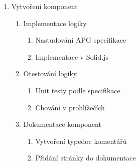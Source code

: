 \begin{enumerate}[label=\arabic*.]
\begin{enumerate}[label*=\arabic*.]
\begin{enumerate}[label*=\arabic*.]
\begin{enumerate}[label*=\arabic*.]
                                  \item Vytvoření typedoc\footnote{\url{https://typedoc.org}} dokumentace
                                  \item Nasazení aplikací
                              \end{enumerate}
                    \end{enumerate}
              \item Vytvoření komponent
                    \begin{enumerate}[label*=\arabic*.]
                        \item Implementace logiky
                              \begin{enumerate}[label*=\arabic*.]
                                  \item Nastudování APG specifikace
                                  \item Implementace v Solid.js
                              \end{enumerate}
                        \item Otestování logiky
                              \begin{enumerate}[label*=\arabic*.]
                                  \item Unit testy podle specifikace
                                  \item Chování v prohlížečích
                              \end{enumerate}
                        \item Dokumentace komponent
                              \begin{enumerate}[label*=\arabic*.]
                                  \item Vytvoření typedoc komentářů
                                  \item Přidání stránky do dokumentace
                              \end{enumerate}
                    \end{enumerate}
          \end{enumerate}
\end{enumerate}

